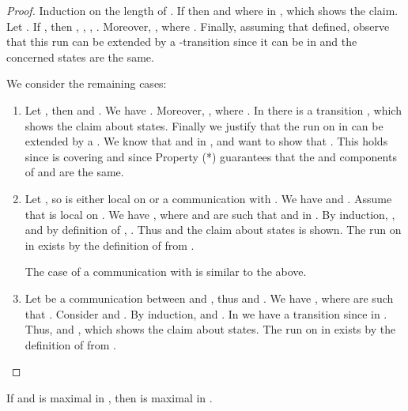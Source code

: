 \documentclass[10pt,a4paper]{article}
\begin{document}
\begin{proof}
  Induction on the length of . If 
  then  and  where  in , which shows the claim. Let
  . If , then , ,
  ,
  . Moreover,
  , where
  . Finally, assuming
  that  defined, observe that this run can be extended by a
  -transition since it can be in  and the concerned states are
  the same.

We consider the remaining cases:
\begin{enumerate}
\item Let , then  and . We have
  .
 Moreover, , where
 . In
  there is a transition , which
 shows the claim about states. Finally we justify that the run on  
 in  can be extended by a .  We know that 
 and 
 in , and want to show that . This holds
 since  is covering and since Property (*) guarantees that
 the  and  components of  and  are
 the same.
\item Let , so  is either local on 
  or a communication with . We have  and
  . Assume that  is local on . We have
  , where  and  are such
  that  and  in . By induction,
  , and
  by definition of , .  Thus
   and the claim about states
  is shown. The run  on  in  exists by the definition
  of  from .

The case of a communication with  is similar to the above.
\item Let  be a communication between  and
  , thus  and . We have , where  are such that
  . Consider  and
  . By
  induction,  and .
  In  we have a transition  since  in . Thus,
   and
  , which shows the
  claim about states. The run on  in  exists by the
  definition of  from .
\end{enumerate}
\end{proof}



\begin{lemma}\label{D: maximal}
  If  and  is maximal in , then
   is maximal in .
\end{lemma}
\end{document}
